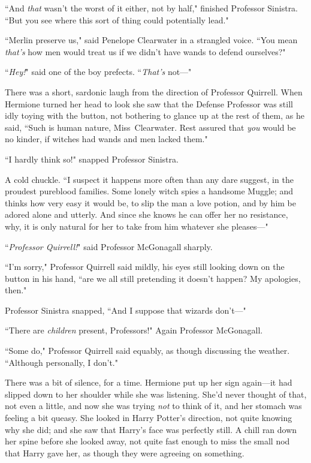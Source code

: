 ``And \emph{that} wasn't the worst of it either, not by half," finished Professor Sinistra. ``But you see where this sort of thing could potentially lead."

``Merlin preserve us," said Penelope Clearwater in a strangled voice. ``You mean \emph{that's} how men would treat us if we didn't have wands to defend ourselves?"

``\emph{Hey!}" said one of the boy prefects. ``\emph{That's} not—"

There was a short, sardonic laugh from the direction of Professor Quirrell. When Hermione turned her head to look she saw that the Defense Professor was still idly toying with the button, not bothering to glance up at the rest of them, as he said, ``Such is human nature, Miss~Clearwater. Rest assured that \emph{you} would be no kinder, if witches had wands and men lacked them."

``I hardly think so!" snapped Professor Sinistra.

A cold chuckle. ``I suspect it happens more often than any dare suggest, in the proudest pureblood families. Some lonely witch spies a handsome Muggle; and thinks how very easy it would be, to slip the man a love potion, and by him be adored alone and utterly. And since she knows he can offer her no resistance, why, it is only natural for her to take from him whatever she pleases—"

``\emph{Professor Quirrell!}" said Professor McGonagall sharply.

``I'm sorry," Professor Quirrell said mildly, his eyes still looking down on the button in his hand, ``are we all still pretending it doesn't happen? My apologies, then."

Professor Sinistra snapped, ``And I suppose that wizards don't—"

``There are \emph{children} present, Professors!" Again Professor McGonagall.

``Some do," Professor Quirrell said equably, as though discussing the weather. ``Although personally, I don't."

There was a bit of silence, for a time. Hermione put up her sign again—it had slipped down to her shoulder while she was listening. She'd never thought of that, not even a little, and now she was trying \emph{not} to think of it, and her stomach was feeling a bit queasy. She looked in Harry Potter's direction, not quite knowing why she did; and she saw that Harry's face was perfectly still. A chill ran down her spine before she looked away, not quite fast enough to miss the small nod that Harry gave her, as though they were agreeing on something.

